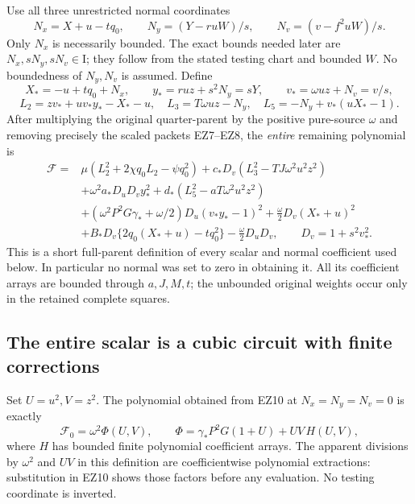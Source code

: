 Use all three unrestricted normal coordinates
\[
 N_x=X+u-tq_0,\qquad
 N_y=(Y-ruW)/s,\qquad N_v=(v-f^2uW)/s.
                                                               \tag{EZ9}
\]
Only $N_x$ is necessarily bounded. The exact bounds needed later are
$N_x,sN_y,sN_v\in\mathrm I$; they follow from the stated testing
chart and bounded $W$. No boundedness of $N_y,N_v$ is assumed.
Define
\[
 X_*=-u+tq_0+N_x,\qquad
 y_*=ruz+s^2N_y=sY,\qquad
 v_*=\omega uz+N_v=v/s,
\]
\[
 L_2=zv_*+uv_*y_*-X_*-u,\quad
 L_3=T\omega uz-N_y,\quad
 L_5=-N_y+v_*(uX_*-1).
\]
After multiplying the original quarter-parent by the positive
pure-source $\omega$ and removing precisely the scaled packets
EZ7--EZ8, the \emph{entire} remaining polynomial is
\[
\begin{split}
\mathcal F={}&
 \mu(L_2^2+2\chi q_0L_2-\psi q_0^2)
 +c_*D_v(L_3^2-TJ\omega^2u^2z^2)\\
 &+\omega^2a_*D_uD_vy_*^2
 +d_*(L_5^2-aT\omega^2u^2z^2)\\
 &+(\omega^2P^2G\gamma_*+\omega/2)
                         D_u(v_*y_*-1)^2
 +\frac{\omega}{2}D_v(X_*+u)^2\\
 &+B_*D_v\{2q_0(X_*+u)-tq_0^2\}
                         -\frac{\omega}{2}D_uD_v,
 \qquad D_v=1+s^2v_*^2 .
\end{split}                                                     \tag{EZ10}
\]
This is a short full-parent definition of every scalar and normal
coefficient used below. In particular no normal was set to zero
in obtaining it. All its coefficient arrays are bounded through
$a,J,M,t$; the unbounded original weights occur only in the
retained complete squares.

\subsection{The entire scalar is a cubic circuit with finite corrections}

Set $U=u^2,V=z^2$. The polynomial obtained from EZ10 at
$N_x=N_y=N_v=0$ is exactly
\[
 \mathcal F_0=\omega^2\Phi(U,V),\qquad
 \Phi=\gamma_*P^2G(1+U)+UV\,H(U,V),                            \tag{EZ11}
\]
where $H$ has bounded finite polynomial coefficient arrays.
The apparent divisions by $\omega^2$ and $UV$ in this definition
are coefficientwise polynomial extractions: substitution in EZ10
shows those factors before any evaluation. No testing coordinate
is inverted.

